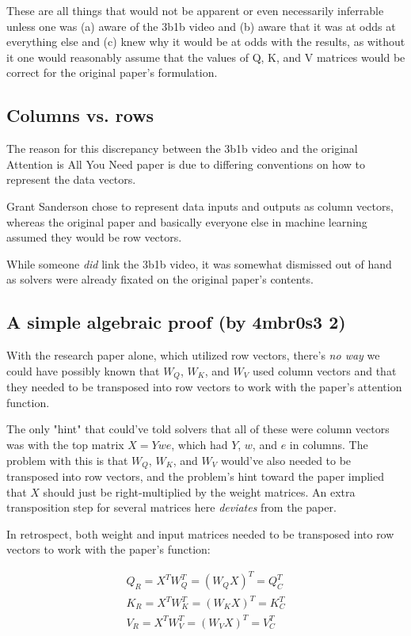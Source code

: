 \documentclass{article}
\begin{document}
These are all things that would not be apparent or even necessarily inferrable unless one was (a) aware of the 3b1b video and (b) aware that it was at odds at everything else and (c) knew why it would be at odds with the results, as without it one would reasonably assume that the values of Q, K, and V matrices would be correct for the original paper's formulation.


\subsection{Columns vs. rows}

The reason for this discrepancy between the 3b1b video and the original Attention is All You Need paper is due to differing conventions on how to represent the data vectors.

Grant Sanderson chose to represent data inputs and outputs as column vectors, whereas the original paper and basically everyone else in machine learning assumed they would be row vectors.

While someone \textit{did} link the 3b1b video, it was somewhat dismissed out of hand as solvers were already fixated on the original paper's contents.


\subsection{A simple algebraic proof \footnotesize{(by 4mbr0s3 2)}}
With the research paper alone, which utilized row vectors, there's \textit{no way} we could have possibly known that $W_Q$, $W_K$, and $W_V$ used column vectors and that they needed to be transposed into row vectors to work with the paper's attention function.

The only "hint" that could've told solvers that all of these were column vectors was with the top matrix $X = Ywe$, which had $Y$, $w$, and $e$ in columns. The problem with this is that $W_Q$, $W_K$, and $W_V$ would've also needed to be transposed into row vectors, and the problem's hint toward the paper implied that $X$
should just be right-multiplied by the weight matrices. An extra transposition step for several matrices here \emph{deviates} from the paper.

In retrospect, both weight and input matrices needed to be transposed into row vectors to work with the paper's function:

\begin{align*}
    Q_R = X^TW_Q^T = (W_QX)^T = Q_C^T\\
    K_R = X^TW_K^T = (W_KX)^T = K_C^T\\
    V_R = X^TW_V^T = (W_VX)^T = V_C^T\\
\end{align*}
\end{document}
